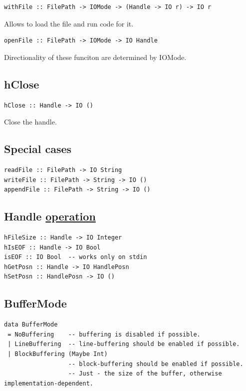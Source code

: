 \documentclass[a4paper,14pt,oneside]{book}
\begin{document}
\begin{verbatim}
withFile :: FilePath -> IOMode -> (Handle -> IO r) -> IO r
\end{verbatim}

Allows to load the file and run code for it.

\begin{verbatim}
openFile :: FilePath -> IOMode -> IO Handle
\end{verbatim}

Directionality of these funciton are determined by IOMode.

\subsection{hClose}
\label{sec:org3a1b6c4}

\begin{verbatim}
hClose :: Handle -> IO ()
\end{verbatim}

Close the handle.

\subsection{Special cases}
\label{sec:orgd6762b2}

\begin{verbatim}
readFile :: FilePath -> IO String
writeFile :: FilePath -> String -> IO ()
appendFile :: FilePath -> String -> IO ()
\end{verbatim}

\subsection{Handle \hyperref[orgf17bdac]{operation}}
\label{sec:org7e71b22}

\begin{verbatim}
hFileSize :: Handle -> IO Integer
hIsEOF :: Handle -> IO Bool
isEOF :: IO Bool  -- works only on stdin
hGetPosn :: Handle -> IO HandlePosn
hSetPosn :: HandlePosn -> IO ()
\end{verbatim}

\subsection{BufferMode}
\label{sec:org50af2cc}

\begin{verbatim}
data BufferMode
 = NoBuffering    -- buffering is disabled if possible.
 | LineBuffering  -- line-buffering should be enabled if possible.
 | BlockBuffering (Maybe Int)
                  -- block-buffering should be enabled if possible.
                  -- Just - the size of the buffer, otherwise implementation-dependent.
\end{verbatim}
\end{document}
